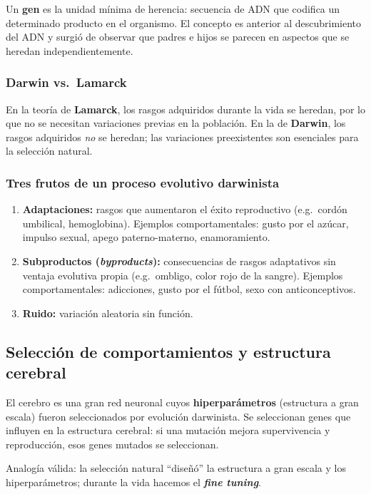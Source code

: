 \documentclass[11pt, a4paper]{article}
\begin{document}
Un \textbf{gen} es la unidad m\'inima de herencia: secuencia de ADN que codifica un determinado producto en el organismo. El concepto es anterior al descubrimiento del ADN y surgi\'o de observar que padres e hijos se parecen en aspectos que se heredan independientemente.

\subsubsection{Darwin vs.\ Lamarck}

En la teor\'ia de \textbf{Lamarck}, los rasgos adquiridos durante la vida se heredan, por lo que no se necesitan variaciones previas en la poblaci\'on. En la de \textbf{Darwin}, los rasgos adquiridos \emph{no} se heredan; las variaciones preexistentes son esenciales para la selecci\'on natural.

\subsubsection{Tres frutos de un proceso evolutivo darwinista}

\begin{enumerate}[nosep]
    \item \textbf{Adaptaciones:} rasgos que aumentaron el \'exito reproductivo (e.g.\ cord\'on umbilical, hemoglobina). Ejemplos comportamentales: gusto por el az\'ucar, impulso sexual, apego paterno-materno, enamoramiento.
    \item \textbf{Subproductos (\emph{byproducts}):} consecuencias de rasgos adaptativos sin ventaja evolutiva propia (e.g.\ ombligo, color rojo de la sangre). Ejemplos comportamentales: adicciones, gusto por el f\'utbol, sexo con anticonceptivos.
    \item \textbf{Ruido:} variaci\'on aleatoria sin funci\'on.
\end{enumerate}

\subsection{Selecci\'on de comportamientos y estructura cerebral}

El cerebro es una gran red neuronal cuyos \textbf{hiperpar\'ametros} (estructura a gran escala) fueron seleccionados por evoluci\'on darwinista. Se seleccionan genes que influyen en la estructura cerebral: si una mutaci\'on mejora supervivencia y reproducci\'on, esos genes mutados se seleccionan.

Analog\'ia v\'alida: la selecci\'on natural ``dise\~n\'o'' la estructura a gran escala y los hiperpar\'ametros; durante la vida hacemos el \textbf{\emph{fine tuning}}.
\end{document}
